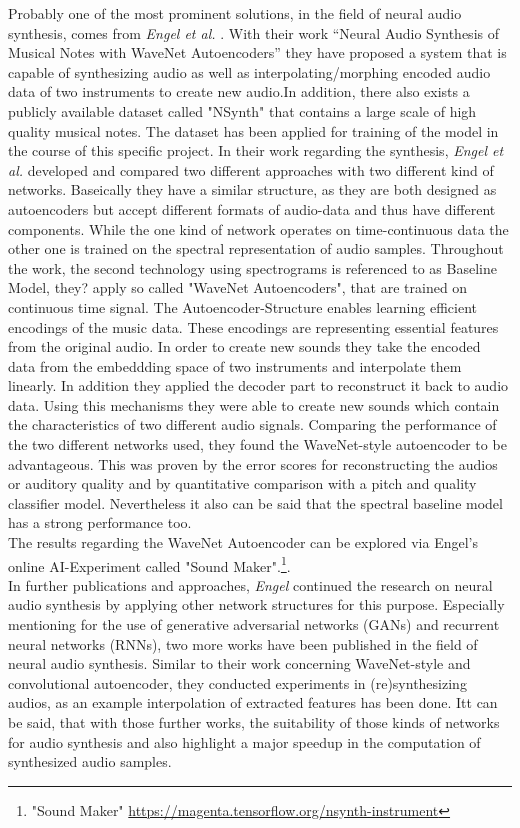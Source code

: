 Probably one of the most prominent solutions, in the field of neural audio synthesis, comes from \textit{Engel et al.} \cite{Engel2017}. With their work “Neural Audio Synthesis of Musical Notes with WaveNet Autoencoders” they have proposed a system that is capable of synthesizing audio as well as interpolating/morphing encoded audio data of two instruments to create new audio.In addition, there also exists a publicly available dataset called "NSynth" that contains a large scale of high quality musical notes. The dataset has been applied for training of the model in the course of this specific project. In their work regarding the synthesis, \textit{Engel et al.} developed and compared two different approaches with two different kind of networks. Baseically they have a similar structure, as they are both designed as autoencoders but accept different formats of audio-data and thus have different components. While the one kind of network operates on time-continuous data the other one is trained on the spectral representation of audio samples. Throughout the work, the second technology using spectrograms is referenced to as Baseline Model, they? apply so called "WaveNet Autoencoders", that are trained on continuous time signal. The Autoencoder-Structure enables learning efficient encodings of the music data. These encodings are representing essential features from the original audio. In order to create new sounds they take the encoded data from the embeddding space of two instruments and interpolate them linearly. In addition they applied the decoder part to reconstruct it back to audio data. Using this mechanisms they were able to create new sounds which contain the characteristics of two different audio signals. Comparing the performance of the two different networks used, they found the WaveNet-style autoencoder to be advantageous. This was proven by the error scores for reconstructing the audios or auditory quality and by quantitative comparison with a pitch and quality classifier model. Nevertheless it also can be said that the spectral baseline model has a strong performance too.\\
The results regarding the WaveNet Autoencoder can be explored via Engel's online AI-Experiment called "Sound Maker".\footnote{"Sound Maker" \url{https://magenta.tensorflow.org/nsynth-instrument}}.\\

In further publications and approaches, \textit{Engel} continued the research on neural audio synthesis by applying other network structures for this purpose. Especially mentioning for the use of generative adversarial networks (GANs) and recurrent neural networks (RNNs), two more works have been published in the field of neural audio synthesis. \cite{Engel2019, hantrakul2019fast} Similar to their work concerning WaveNet-style and convolutional autoencoder, they conducted experiments in (re)synthesizing audios, as an example interpolation of extracted features has been done. Itt can be said, that with those further works, the suitability of those kinds of networks for audio synthesis and also highlight a major speedup in the computation of synthesized audio samples.\\

